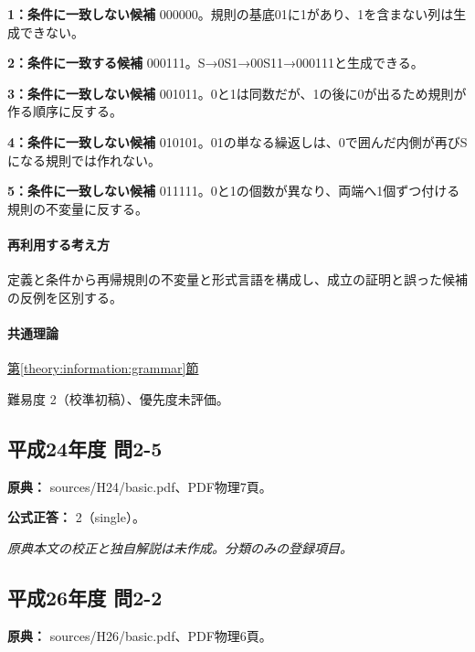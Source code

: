 \noindent\textbf{1：条件に一致しない候補} 000000。規則の基底01に1があり、1を含まない列は生成できない。\par

\noindent\textbf{2：条件に一致する候補} 000111。S→0S1→00S11→000111と生成できる。\par

\noindent\textbf{3：条件に一致しない候補} 001011。0と1は同数だが、1の後に0が出るため規則が作る順序に反する。\par

\noindent\textbf{4：条件に一致しない候補} 010101。01の単なる繰返しは、0で囲んだ内側が再びSになる規則では作れない。\par

\noindent\textbf{5：条件に一致しない候補} 011111。0と1の個数が異なり、両端へ1個ずつ付ける規則の不変量に反する。\par

\paragraph{再利用する考え方} 定義と条件から再帰規則の不変量と形式言語を構成し、成立の証明と誤った候補の反例を区別する。

\paragraph{共通理論} \hyperref[theory:information:grammar]{第\ref*{theory:information:grammar}節}

\par 難易度 2（校準初稿）、優先度未評価。

\subsection{平成24年度 問2-5}
\label{q:h24-reg-basic-2-5}

\noindent\textbf{原典：} sources/H24/basic.pdf、PDF物理7頁。

\textbf{公式正答：} 2（single）。

\par\textit{原典本文の校正と独自解説は未作成。分類のみの登録項目。}

\subsection{平成26年度 問2-2}
\label{q:h26-reg-basic-2-2}

\noindent\textbf{原典：} sources/H26/basic.pdf、PDF物理6頁。

